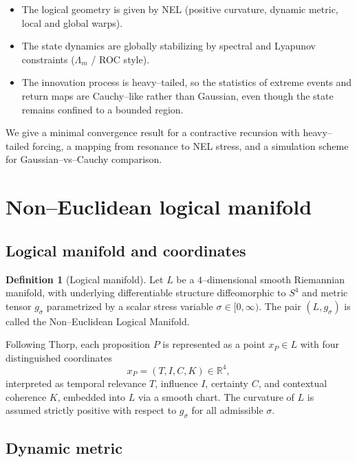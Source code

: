 \documentclass[11pt]{article}
\theoremstyle{plain}
\theoremstyle{definition}
\newtheorem{definition}[theorem]{Definition}
\numberwithin{equation}{section}
\begin{document}
\begin{itemize}
  \item The logical geometry is given by NEL (positive curvature,
  dynamic metric, local and global warps).

  \item The state dynamics are globally stabilizing by spectral and
  Lyapunov constraints ($\Lambda_m$ / ROC style).

  \item The innovation process is heavy--tailed, so the statistics of
  extreme events and return maps are Cauchy--like rather than Gaussian,
  even though the state remains confined to a bounded region.
\end{itemize}

We give a minimal convergence result for a contractive recursion with
heavy--tailed forcing, a mapping from resonance to NEL stress, and a
simulation scheme for Gaussian--vs--Cauchy comparison.

\section{Non--Euclidean logical manifold}

\subsection{Logical manifold and coordinates}

\begin{definition}[Logical manifold]
Let $L$ be a $4$--dimensional smooth Riemannian manifold, with
underlying differentiable structure diffeomorphic to $S^4$ and metric
tensor $g_\sigma$ parametrized by a scalar stress variable
$\sigma \in [0,\infty)$. The pair $(L, g_\sigma)$ is called the
Non--Euclidean Logical Manifold.
\end{definition}

Following Thorp, each proposition $P$ is represented as a point
$x_P \in L$ with four distinguished coordinates
\[
x_P = (T, I, C, K) \in \mathbb{R}^4,
\]
interpreted as temporal relevance $T$, influence $I$, certainty $C$,
and contextual coherence $K$, embedded into $L$ via a smooth chart.
The curvature of $L$ is assumed strictly positive with respect to
$g_\sigma$ for all admissible $\sigma$.

\subsection{Dynamic metric}
\end{document}
